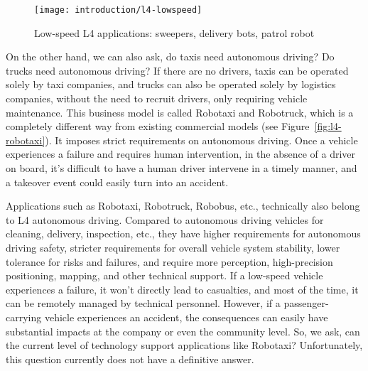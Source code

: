 \begin{figure}[!t]
	\centering
	\texttt{[image: introduction/l4-lowspeed]}
	\caption{Low-speed L4 applications: sweepers, delivery bots, patrol robot}
	\label{fig:l4-lowspeed}
\end{figure}

On the other hand, we can also ask, do taxis need autonomous driving? Do trucks need autonomous driving? If there are no drivers, taxis can be operated solely by taxi companies, and trucks can also be operated solely by logistics companies, without the need to recruit drivers, only requiring vehicle maintenance. This business model is called Robotaxi and Robotruck, which is a completely different way from existing commercial models (see Figure~\ref{fig:l4-robotaxi}). It imposes strict requirements on autonomous driving. Once a vehicle experiences a failure and requires human intervention, in the absence of a driver on board, it's difficult to have a human driver intervene in a timely manner, and a takeover event could easily turn into an accident.

Applications such as Robotaxi, Robotruck, Robobus, etc., technically also belong to L4 autonomous driving. Compared to autonomous driving vehicles for cleaning, delivery, inspection, etc., they have higher requirements for autonomous driving safety, stricter requirements for overall vehicle system stability, lower tolerance for risks and failures, and require more perception, high-precision positioning, mapping, and other technical support. If a low-speed vehicle experiences a failure, it won't directly lead to casualties, and most of the time, it can be remotely managed by technical personnel. However, if a passenger-carrying vehicle experiences an accident, the consequences can easily have substantial impacts at the company or even the community level. So, we ask, can the current level of technology support applications like Robotaxi? Unfortunately, this question currently does not have a definitive answer.

